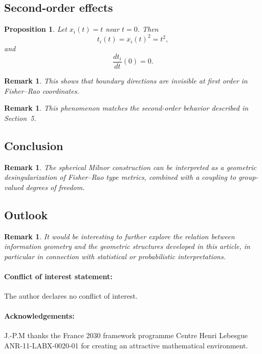 \documentclass[11pt]{amsart}
\newtheorem{proposition}[theorem]{Proposition}
\newtheorem{remark}[theorem]{Remark}
\begin{document}
\subsection{Second-order effects}

\begin{proposition}
Let $x_i(t) = t$ near $t=0$. Then
\[
t_i(t) = x_i(t)^2 = t^2,
\]
and
\[
\frac{dt_i}{dt}(0) = 0.
\]
\end{proposition}

\begin{remark}
This shows that boundary directions are invisible at first order in Fisher--Rao coordinates.
\end{remark}

\begin{remark}
This phenomenon matches the second-order behavior described in Section~5.
\end{remark}

\subsection{Conclusion}

\begin{remark}
The spherical Milnor construction can be interpreted as a geometric desingularization of Fisher--Rao type metrics, combined with a coupling to group-valued degrees of freedom.
\end{remark}
\subsection{Outlook}

\begin{remark}
It would be interesting to further explore the relation between information geometry and the geometric structures developed in this article, in particular in connection with statistical or probabilistic interpretations.
\end{remark}

\vskip 12pt

\paragraph{Conflict of interest statement:} The author declares no conflict of interest.

\vskip 12pt

\paragraph{\bf Acknowledgements:} J.-P.M  thanks the France 2030 framework programme Centre Henri Lebesgue ANR-11-LABX-0020-01 
for creating an attractive mathematical environment.
\end{document}
